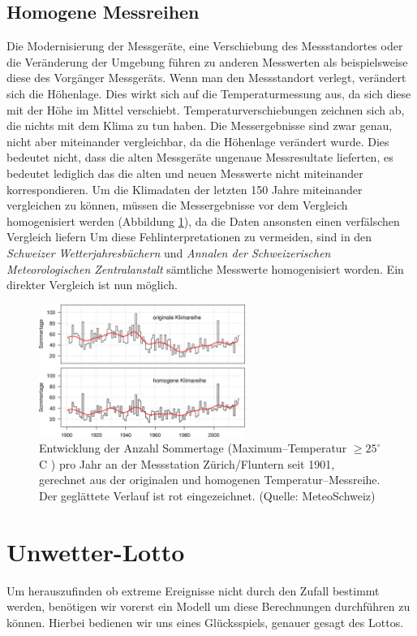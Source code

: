 \begin{refsection}
\subsection{Homogene Messreihen}
Die Modernisierung der Messgeräte,  eine Verschiebung des Messstandortes oder die Veränderung der Umgebung führen zu anderen Messwerten als beispielsweise diese des Vorgänger Messgeräts. Wenn man den Messstandort verlegt, verändert sich die Höhenlage. Dies wirkt sich auf die Temperaturmessung aus, da sich diese mit der Höhe im Mittel verschiebt. Temperaturverschiebungen zeichnen sich ab, die nichts mit dem Klima zu tun haben. Die Messergebnisse sind zwar genau, nicht aber miteinander vergleichbar, da die Höhenlage verändert wurde.
Dies bedeutet nicht, dass die alten Messgeräte ungenaue Messresultate lieferten, es bedeutet lediglich das die alten und neuen Messwerte nicht miteinander korrespondieren. 
Um die Klimadaten der letzten 150 Jahre miteinander vergleichen zu können, müssen die Messergebnisse vor dem Vergleich homogenisiert werden (Abbildung \ref{Homogen}), da die Daten ansonsten einen verfälschen Vergleich liefern
Um diese Fehlinterpretationen zu vermeiden, sind in den \textit{Schweizer Wetterjahresbüchern} und \textit{Annalen der Schweizerischen Meteorologischen Zentralanstalt} sämtliche Messwerte homogenisiert worden. Ein direkter Vergleich ist nun möglich.

\begin{figure}
\centering
\includegraphics[width=0.6\textwidth]{extrem/Homogen.jpg}
\caption{Entwicklung der Anzahl Sommertage (Maximum--Temperatur $\ge 25^{\circ}$C ) pro Jahr an der Messstation Zürich/Fluntern seit 1901, gerechnet aus der originalen und homogenen Temperatur--Messreihe. Der geglättete Verlauf ist rot eingezeichnet. (Quelle: MeteoSchweiz)}
\label{Homogen}
\end{figure}


\section{Unwetter-Lotto}
Um herauszufinden ob extreme Ereignisse nicht durch den Zufall bestimmt werden, benötigen wir vorerst ein Modell um diese Berechnungen durchführen zu können.
Hierbei bedienen wir uns eines Glücksspiels, genauer gesagt des Lottos.


\end{refsection}
